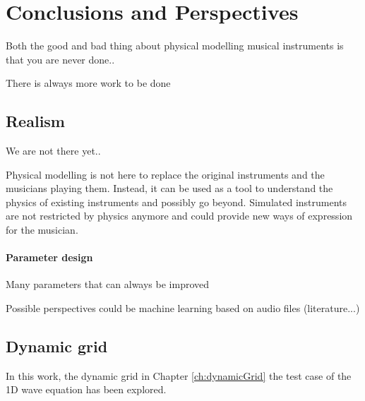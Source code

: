 \chapter{Conclusions and Perspectives}\label{ch:conclusion}

Both the good and bad thing about physical modelling musical instruments is that you are never done..

There is always more work to be done


\section{Realism}
We are not there yet.. 

Physical modelling is not here to replace the original instruments and the musicians playing them. Instead, it can be used as a tool to understand the physics of existing instruments and possibly go beyond. Simulated instruments are not restricted by physics anymore and could provide new ways of expression for the musician. 

\subsubsection{Parameter design}
Many parameters that can always be improved

Possible perspectives could be machine learning based on audio files (literature...)

\section{Dynamic grid}
In this work, the dynamic grid in Chapter \ref{ch:dynamicGrid} the test case of the 1D wave equation has been explored. 